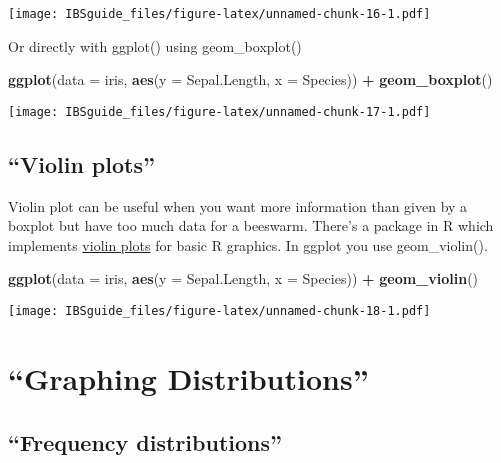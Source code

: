 \documentclass[]{book}
\newenvironment{Shaded}{\begin{snugshade}}{\end{snugshade}}
\newcommand{\KeywordTok}[1]{\textcolor[rgb]{0.13,0.29,0.53}{\textbf{#1}}}
\newcommand{\DataTypeTok}[1]{\textcolor[rgb]{0.13,0.29,0.53}{#1}}
\newcommand{\StringTok}[1]{\textcolor[rgb]{0.31,0.60,0.02}{#1}}
\newcommand{\OperatorTok}[1]{\textcolor[rgb]{0.81,0.36,0.00}{\textbf{#1}}}
\newcommand{\NormalTok}[1]{#1}
\theoremstyle{definition}
\theoremstyle{definition}
\theoremstyle{definition}
\theoremstyle{remark}
\begin{document}
\texttt{[image: IBSguide\_files/figure-latex/unnamed-chunk-16-1.pdf]}

Or directly with ggplot() using geom\_boxplot()

\begin{Shaded}
\begin{Highlighting}[]
\KeywordTok{ggplot}\NormalTok{(}\DataTypeTok{data =}\NormalTok{ iris,}
       \KeywordTok{aes}\NormalTok{(}\DataTypeTok{y =}\NormalTok{ Sepal.Length,}
           \DataTypeTok{x =}\NormalTok{ Species)) }\OperatorTok{+}
\StringTok{  }\KeywordTok{geom_boxplot}\NormalTok{()}
\end{Highlighting}
\end{Shaded}

\texttt{[image: IBSguide\_files/figure-latex/unnamed-chunk-17-1.pdf]}

\subsection{\texorpdfstring{``Violin
plots''}{Violin plots}}\label{violin-plots}

Violin plot can be useful when you want more information than given by a
boxplot but have too much data for a beeswarm. There's a package in R
which implements
\href{https://www.statmethods.net/graphs/boxplot.html}{violin plots} for
basic R graphics. In ggplot you use geom\_violin().

\begin{Shaded}
\begin{Highlighting}[]
\KeywordTok{ggplot}\NormalTok{(}\DataTypeTok{data =}\NormalTok{ iris,}
       \KeywordTok{aes}\NormalTok{(}\DataTypeTok{y =}\NormalTok{ Sepal.Length,}
           \DataTypeTok{x =}\NormalTok{ Species)) }\OperatorTok{+}
\StringTok{  }\KeywordTok{geom_violin}\NormalTok{()}
\end{Highlighting}
\end{Shaded}

\texttt{[image: IBSguide\_files/figure-latex/unnamed-chunk-18-1.pdf]}

\section{\texorpdfstring{``Graphing
Distributions''}{Graphing Distributions}}\label{graphing-distributions}

\subsection{\texorpdfstring{``Frequency
distributions''}{Frequency distributions}}\label{frequency-distributions}
\end{document}

